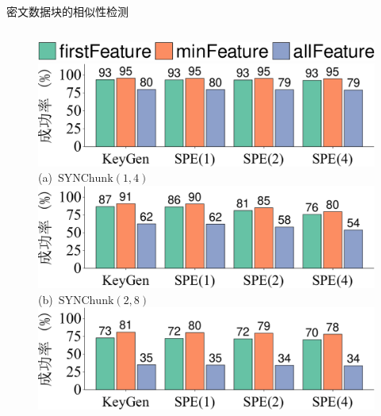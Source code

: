 \documentclass{beamer}
\begin{document}
\begin{frame}{密文数据块的相似性检测}
    \begin{columns}
        \begin{column}{.5\textwidth}
            \vspace{-1em}
            \begin{figure}[!htb]
                \centering
                \includegraphics[width=0.8\linewidth]{../pic/featurespy/plot/detection/syn/synBarPlotDetect_legend.pdf}\\
                \includegraphics[width=\linewidth]{../pic/featurespy/plot/detection/syn/syn-p1-q4-detect.pdf}  \\
                \vspace{-3pt}
                \mbox{\fontsize{8.0pt}{\baselineskip}\selectfont (a) $\textrm{SYNChunk}(1, 4)$}                                                        \\
                \vspace{-3pt}
                \includegraphics[width=\linewidth]{../pic/featurespy/plot/detection/syn/syn-p2-q8-detect.pdf}    \\
                \vspace{-3pt}
                \mbox{\fontsize{8.0pt}{\baselineskip}\selectfont (b) $\textrm{SYNChunk}(2, 8)$}                                                          \\
                \vspace{-3pt}
                \includegraphics[width=\linewidth]{../pic/featurespy/plot/detection/syn/syn-p4-q16-detect.pdf} \\

\end{figure}
\end{column}
\end{columns}
\end{frame}
\end{document}
